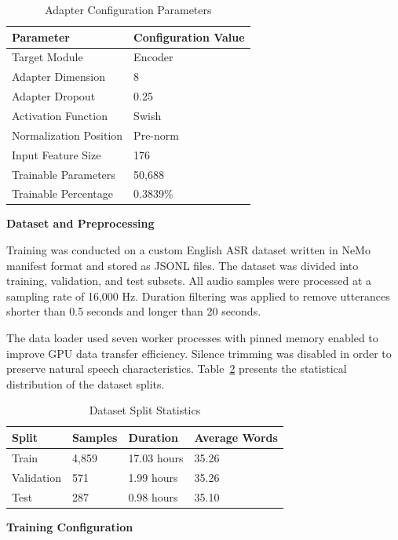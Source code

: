 \begin{table}[H]
\caption{Adapter Configuration Parameters}
\label{tab:fastconformer_adapter}
\centering
\begin{tabular}{|l|l|}
\hline
\textbf{Parameter} & \textbf{Configuration Value} \\
\hline
Target Module & Encoder \\
Adapter Dimension & 8 \\
Adapter Dropout & 0.25 \\
Activation Function & Swish \\
Normalization Position & Pre-norm \\
Input Feature Size & 176 \\
Trainable Parameters & 50,688 \\
Trainable Percentage & 0.3839\% \\
\hline
\end{tabular}
\end{table}

\textbf{Dataset and Preprocessing}

Training was conducted on a custom English ASR dataset written in NeMo manifest format and stored as JSONL files. The dataset was divided into training, validation, and test subsets. All audio samples were processed at a sampling rate of 16,000 Hz. Duration filtering was applied to remove utterances shorter than 0.5 seconds and longer than 20 seconds.

The data loader used seven worker processes with pinned memory enabled to improve GPU data transfer efficiency. Silence trimming was disabled in order to preserve natural speech characteristics. Table~\ref{tab:fastconformer_dataset} presents the statistical distribution of the dataset splits.

\begin{table}[H]
\caption{Dataset Split Statistics}
\label{tab:fastconformer_dataset}
\centering
\begin{tabular}{|l|l|l|l|}
\hline
\textbf{Split} & \textbf{Samples} & \textbf{Duration} & \textbf{Average Words} \\
\hline
Train & 4,859 & 17.03 hours & 35.26 \\
Validation & 571 & 1.99 hours & 35.26 \\
Test & 287 & 0.98 hours & 35.10 \\
\hline
\end{tabular}
\end{table}

\textbf{Training Configuration}

